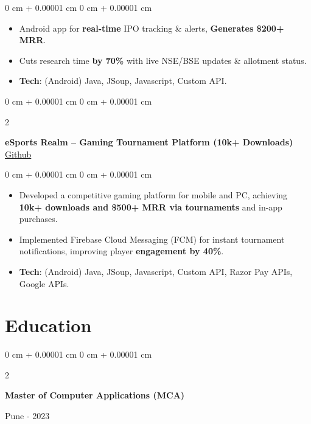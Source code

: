 \documentclass[10pt, letterpaper]{article}
\newenvironment{highlights}{
    \begin{itemize}[
        topsep=0.10 cm,
        parsep=0.10 cm,
        partopsep=0pt,
        itemsep=0pt,
        leftmargin=0 cm + 10pt,
        labelindent=0pt
    ]
}{
    \end{itemize}
} %
\newenvironment{onecolentry}{
    \begin{adjustwidth}{
        0 cm + 0.00001 cm
    }{
        0 cm + 0.00001 cm
    }
}{
    \end{adjustwidth}
} %
\newenvironment{twocolentry}[2][]{
    \onecolentry
    \def\secondColumn{#2}
    \setcolumnwidth{\fill, 4.5 cm}
    \begin{paracol}{2}
}{
    \switchcolumn \raggedleft \secondColumn
    \end{paracol}
    \endonecolentry
} %
\begin{document}
        \vspace{0.10 cm}
        \begin{onecolentry}
            \begin{highlights}
                \item Android app for \textbf{real-time} IPO tracking \& alerts, \textbf{Generates \$200+ MRR}.
                \item Cuts research time \textbf{by 70\%} with live NSE/BSE updates \& allotment status.
                \item \textbf{Tech}: (Android) Java, JSoup, Javascript, Custom API.
            \end{highlights}
        \end{onecolentry}

        \vspace{0.2 cm}

        \begin{twocolentry}{
            \href{https://github.com/aushin19/eSports_Realm}{Github}
        }
            \textbf{eSports Realm – Gaming Tournament Platform (10k+ Downloads)}\end{twocolentry}

        \vspace{0.10 cm}
        \begin{onecolentry}
            \begin{highlights}
                \item Developed a competitive gaming platform for mobile and PC, achieving \textbf{10k+ downloads and \$500+ MRR via tournaments} and in-app purchases.
                \item Implemented Firebase Cloud Messaging (FCM) for instant tournament notifications, improving player \textbf{engagement by 40\%}.
                \item \textbf{Tech}: (Android) Java, JSoup, Javascript, Custom API, Razor Pay APIs, Google APIs.
            \end{highlights}
        \end{onecolentry}


    \section{Education}


        \begin{twocolentry}{Pune - 2023}
            \textbf{Master of Computer Applications (MCA)}
        \end{twocolentry}
\end{document}
